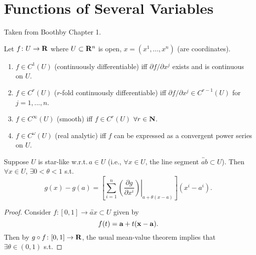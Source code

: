 \chapter{Functions of Several Variables}
Taken from Boothby Chapter 1.
\begin{definition}
Let $f\colon U\to\mathbf{R}$ where $U\subset\mathbf{R}^n$ is open, $x=(x^1,...,x^n)$
(are coordinates).
\begin{enumerate}[label=(\alph*)]
\item $f\in C^1(U)$ (continuously differentiable) iff $\partial f/\partial
  x^j$ exists and is continuous on $U$.
\item $f\in C^r(U)$ ($r$-fold continuously differentiable) iff $\partial
  f/\partial x^j\in C^{r-1}(U)$ for $j=1,...,n$.
\item $f\in C^\infty(U)$ (smooth) iff $f\in C^r(U)$ $\forall r\in\mathbf{N}$.
\item $f\in C^\omega(U)$ (real analytic) iff $f$ can be expressed as a
  convergent power series on $U$.
\end{enumerate}
\end{definition}
\begin{theorem}
Suppose $U$ is star-like w.r.t.\,$a\in U$ (i.e., $\forall x\in U$, the line
segment $\overleftrightarrow{ab}\subset U$). Then $\forall x\in U$,
$\exists 0<\theta<1$ s.t.
\[
g(x)-g(a)=\left[\sum_{i=1}^n
\left.\left(\frac{\partial g}{\partial x^i}\right)\right|_{a+\theta(x-a)}
\right](x^i-a^i).
\]
\end{theorem}
\begin{proof}
Consider $f\colon[0,1]\to\overleftrightarrow{ax}\subset U$ given by
\[
f(t)=\mathbf{a}+t(\mathbf{x}-\mathbf{a}).
\]
Then by $g\circ f\colon[0,1]\to\mathbf{R}$, the usual mean-value theorem implies
that $\exists\theta\in(0,1)$ s.t.
\end{proof}

